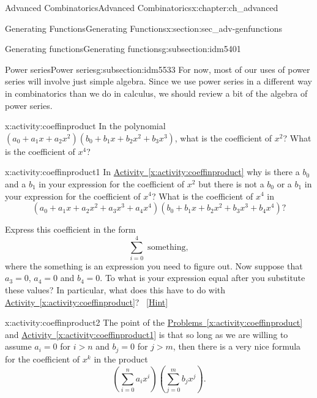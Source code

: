 \documentclass[oneside,10pt,]{book}
\numberwithin{equation}{chapter}
\begin{document}
\begin{chapterptx}{Advanced Combinatorics}{}{Advanced Combinatorics}{}{}{x:chapter:ch_advanced}
\begin{sectionptx}{Generating Functions}{}{Generating Functions}{}{}{x:section:sec_adv-genfunctions}
\begin{subsectionptx}{Generating functions}{}{Generating functions}{}{}{g:subsection:idm5401}
\end{subsectionptx}
%
%
\typeout{************************************************}
\typeout{************************************************}
%
\begin{subsectionptx}{Power series}{}{Power series}{}{}{g:subsection:idm5533}
For now, most of our uses of power series will involve just simple algebra. Since we use power series in a different way in combinatorics than we do in calculus, we should review a bit of the algebra of power series.%
\begin{activity}{}{x:activity:coeffinproduct}%
In the polynomial \((a_0 +a_1x+a_2x^2)(b_0+b_1x+b_2x^2+b_3x^3)\), what is the coefficient of \(x^2\)? What is the coefficient of \(x^4\)?%
\end{activity}
\begin{activity}{}{x:activity:coeffinproduct1}%
In \hyperref[x:activity:coeffinproduct]{Activity~\ref{x:activity:coeffinproduct}} why is there a \(b_0\) and a \(b_1\) in your expression for the coefficient of \(x^2\) but there is not a \(b_0\) or a \(b_1\) in your expression for the coefficient of \(x^4\)? What is the coefficient of \(x^4\) in%
\begin{equation*}
(a_0+a_1x+a_2x^2+a_3x^3+a_4x^4)(b_0+b_1x+b_2x^2
+b_3x^3+b_4x^4)?
\end{equation*}
%
\par
Express this coefficient in the form%
\begin{equation*}
\sum_{i=0}^4 \mbox{ something} ,
\end{equation*}
where the something is an expression you need to figure out. Now suppose that \(a_3=0\), \(a_4=0\) and \(b_4=0\). To what is your expression equal after you substitute these values? In particular, what does this have to do with \hyperref[x:activity:coeffinproduct]{Activity~\ref{x:activity:coeffinproduct}}?%
\qquad~\hfill{\tiny\hyperlink{g:hint:idm5566-back}{[Hint]}}\end{activity}
\begin{activity}{}{x:activity:coeffinproduct2}%
The point of the \hyperref[x:activity:coeffinproduct]{Problems~\ref{x:activity:coeffinproduct}} and \hyperref[x:activity:coeffinproduct1]{Activity~\ref{x:activity:coeffinproduct1}} is that so long as we are willing to assume \(a_i=0\) for \(i>n\) and \(b_j =0\) for \(j>m\), then there is a very nice formula for the coefficient of \(x^k\) in the product%
\begin{equation*}
\left(\sum_{i=0}^n a_ix^i\right)\left(\sum_{j=0}^m b_jx^j\right).

\end{equation*}
\end{activity}
\end{subsectionptx}
\end{sectionptx}
\end{chapterptx}
\end{document}
